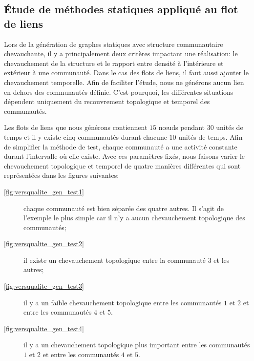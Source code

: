 %



\subsection{Étude de méthodes statiques appliqué au flot de liens}
\label{sec:versqualite_statique}

Lors de la génération de graphes statiques avec structure communautaire chevauchante, il y a principalement deux critères impactant une réalisation: le chevauchement de la structure et le rapport entre densité à l'intérieure et extérieur à une communauté.
Dans le cas des flots de liens, il faut aussi ajouter le chevauchement temporelle.
Afin de faciliter l'étude, nous ne générons aucun lien en dehors des communautés définie.
C'est pourquoi, les différentes situations dépendent uniquement du recouvrement topologique et temporel des communautés.
 
Les flots de liens que nous générons contiennent $15$ n\oe uds pendant $30$ unités de temps et il y existe cinq communautés durant chacune $10$ unités de temps.
Afin de simplifier la méthode de test, chaque communauté a une activité constante durant l'intervalle où elle existe.
Avec ces paramètres fixés, nous faisons varier le chevauchement topologique et temporel de quatre manières différentes qui sont représentées dans les figures suivantes:

\begin{description}
\item[\ref{fig:versqualite_gen_test1}] chaque communauté est bien séparée des quatre autres. Il s'agit de l'exemple le plus simple car il n'y a aucun chevauchement topologique des communautés;
\item[\ref{fig:versqualite_gen_test2}] il existe un chevauchement topologique entre la communauté $3$ et les autres;
\item[\ref{fig:versqualite_gen_test3}] il y a un faible chevauchement topologique entre les communautés $1$ et $2$ et entre les communautés $4$ et $5$.
\item[\ref{fig:versqualite_gen_test4}] il y a un chevauchement topologique plus important entre les communautés $1$ et $2$ et entre les communautés $4$ et $5$.
\end{description}


